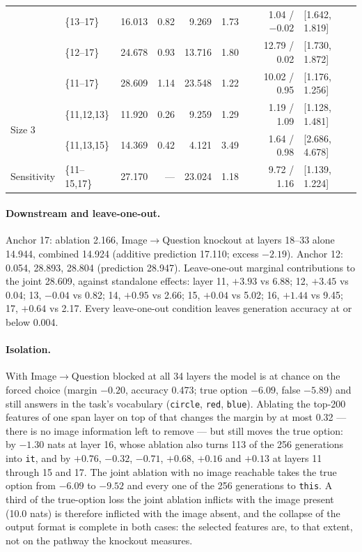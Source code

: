 \documentclass[11pt,a4paper]{article}
\begin{document}
\begin{table}[h]
\begin{tabular}{llrrrrrl}
      & \{13--17\} & 16.013 & 0.82 &  9.269 & 1.73 & 1.04 / $-0.02$ & [1.642, 1.819] \\
      & \{12--17\} & 24.678 & 0.93 & 13.716 & 1.80 & 12.79 / 0.02 & [1.730, 1.872] \\
      & \{11--17\} & 28.609 & 1.14 & 23.548 & 1.22 & 10.02 / 0.95 & [1.176, 1.256] \\
    \midrule
    \multirow{2}{*}{Size 3}
      & \{11,12,13\} & 11.920 & 0.26 &  9.259 & 1.29 & 1.19 / 1.09 & [1.128, 1.481] \\
      & \{11,13,15\} & 14.369 & 0.42 &  4.121 & 3.49 & 1.64 / 0.98 & [2.686, 4.678] \\
    \midrule
    Sensitivity & \{11--15,17\} & 27.170 & --- & 23.024 & 1.18 & 9.72 / 1.16 & [1.139, 1.224] \\
    \bottomrule
  \end{tabular}
\end{table}

\paragraph{Downstream and leave-one-out.} Anchor 17: ablation 2.166,
Image$\rightarrow$Question knockout at layers 18--33 alone 14.944, combined
14.924 (additive prediction 17.110; excess $-2.19$). Anchor 12: 0.054, 28.893,
28.804 (prediction 28.947). Leave-one-out marginal contributions to the joint
28.609, against standalone effects: layer 11, $+3.93$ vs 6.88; 12, $+3.45$ vs
0.04; 13, $-0.04$ vs 0.82; 14, $+0.95$ vs 2.66; 15, $+0.04$ vs 5.02; 16,
$+1.44$ vs 9.45; 17, $+0.64$ vs 2.17. Every leave-one-out condition leaves
generation accuracy at or below 0.004.

\paragraph{Isolation.} With Image$\rightarrow$Question blocked at all 34 layers
the model is at chance on the forced choice (margin $-0.20$, accuracy 0.473;
true option $-6.09$, false $-5.89$) and still answers in the task's
vocabulary (\texttt{circle}, \texttt{red}, \texttt{blue}). Ablating the top-200
features of one span layer on top of that changes the margin by at most 0.32
--- there is no image information left to remove --- but still moves the
true option: by $-1.30$ nats at layer 16, whose ablation also turns 113 of the
256 generations into \texttt{it}, and by $+0.76$, $-0.32$, $-0.71$, $+0.68$,
$+0.16$ and $+0.13$ at layers 11 through 15 and 17. The joint ablation with no
image reachable takes the true option from $-6.09$ to $-9.52$ and every one of
the 256 generations to \texttt{this}. A third of the true-option loss the joint
ablation inflicts with the image present (10.0 nats) is therefore inflicted
with the image absent, and the collapse of the output format is complete in
both cases: the selected features are, to that extent, not on the pathway the
knockout measures.
\end{document}
